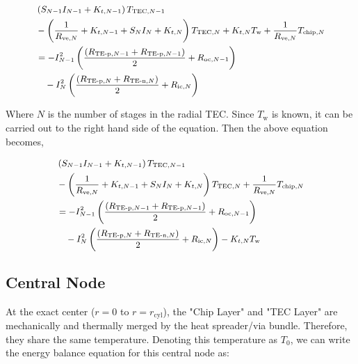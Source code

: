 \documentclass[10pt,a4paper,twocolumn]{article}
\begin{document}
\begin{equation*}
  \small
  \begin{aligned}
     & \left(S_{N-1}I_{N-1}+K_{t,N-1}\right)T_{\text{TEC},N-1}\\ &-\left(\frac{1}{R_{\text{ve},N}}+K_{t,N-1}+S_{N}I_{N}+K_{t,N} \right)T_{\text{TEC},N} +K_{t,N}T_{\text{w}}
    +\frac{1}{R_{\text{ve},N}}T_{\text{chip},N}                                                                                                     \\ &=-I_{N-1}^2 \left( \frac{(R_{\text{TE-p},N-1}+R_{\text{TE-p},N-1})}{2} + R_{\text{oc},N-1} \right) \\
     & \quad - I_{N}^2 \left( \frac{(R_{\text{TE-p},N}+R_{\text{TE-n},N})}{2} + R_{\text{ic},N} \right)
  \end{aligned}
\end{equation*}

Where $N$ is the number of stages in the radial TEC. Since $T_{\text{w}}$ is known, it can be carried out to the right hand side of the equation. Then the above equation becomes,

\begin{equation}
  \small
  \begin{aligned}
     & \left(S_{N-1}I_{N-1}+K_{t,N-1}\right)T_{\text{TEC},N-1}\\ &-\left(\frac{1}{R_{\text{ve},N}}+K_{t,N-1}+S_{N}I_{N}+K_{t,N} \right)T_{\text{TEC},N} +\frac{1}{R_{\text{ve},N}}T_{\text{chip},N}                                                                                                     \\ &=-I_{N-1}^2 \left( \frac{(R_{\text{TE-p},N-1}+R_{\text{TE-p},N-1})}{2} + R_{\text{oc},N-1} \right) \\
     & \quad - I_{N}^2 \left( \frac{(R_{\text{TE-p},N}+R_{\text{TE-n},N})}{2} + R_{\text{ic},N} \right) - K_{t,N} T_{\text{w}}
  \end{aligned}
\end{equation}

\subsection{Central Node}

At the exact center ($r=0$ to $r=r_{\text{cyl}}$), the "Chip Layer" and "TEC Layer" are mechanically and thermally merged by the heat spreader/via bundle. Therefore, they share the same temperature. Denoting this temperature as $T_{0}$, we can write the energy balance equation for this central node as:
\end{document}
